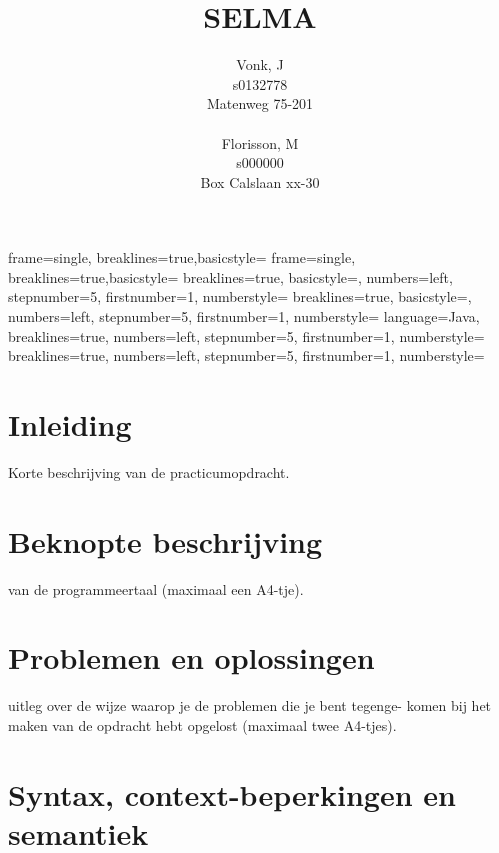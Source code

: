 \documentclass[]{article}
\title{SELMA}
\author{ 
Vonk, J\\
s0132778\\
Matenweg 75-201\\
\\
Florisson, M\\
s000000\\
Box Calslaan xx-30}
\begin{document}
	{frame=single, breaklines=true,basicstyle=\footnotesize}
	{frame=single, breaklines=true,basicstyle=\small}
	{breaklines=true, basicstyle=\scriptsize, numbers=left, stepnumber=5, firstnumber=1, numberstyle=\tiny}	
	{breaklines=true, basicstyle=\scriptsize, numbers=left, stepnumber=5, firstnumber=1, numberstyle=\tiny}	
	{language=Java, breaklines=true, numbers=left, stepnumber=5, firstnumber=1, numberstyle=\tiny}	
	{breaklines=true, numbers=left, stepnumber=5, firstnumber=1, numberstyle=\tiny}	

\begin{titlepage}
\maketitle 
\end{titlepage}
\tableofcontents{}

\newpage
\section{Inleiding}
Korte beschrijving van de practicumopdracht.

\newpage
\section{Beknopte beschrijving}
van de programmeertaal (maximaal een A4-tje).

\newpage
\section{Problemen en oplossingen}
uitleg over de wijze waarop je de problemen die je bent tegenge-
komen bij het maken van de opdracht hebt opgelost (maximaal twee A4-tjes).

\newpage
\section{Syntax, context-beperkingen en semantiek}

\end{document}
